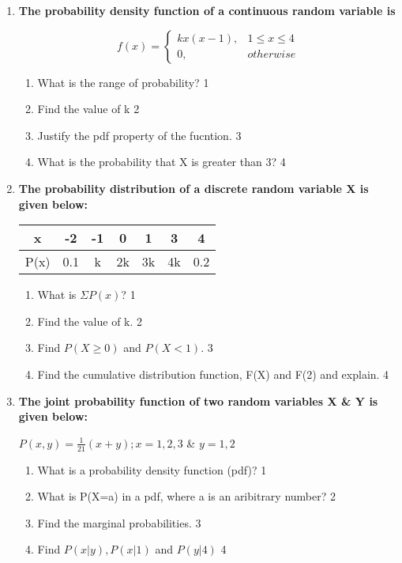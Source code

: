 \documentclass[a4paper,oneside, margin=1.4in]{book}
\begin{document}
\begin{enumerate}
    \item
  \textbf{The probability density function of a continuous random variable is}

$$
  f(x) =
\begin{cases}
kx(x-1),  & 1 \le x \le 4 \\
0, & otherwise
\end{cases}
$$

  \begin{enumerate}
    \item
	What is the range of probability? \hfill 1
    \item
    	Find the value of k \hfill 2
    \item
    	Justify the pdf property of the fucntion. \hfill 3
     \item
     	What is the probability that X is greater than 3?  \hfill 4
  \end{enumerate}


 \item
	  \textbf{The probability distribution of a discrete random variable X is given below:} 

	  \begin{table}[h]
	  \begin{center}
\begin{tabular}{c|cccccc}
x    & -2   & -1 & 0   & 1 & 3 & 4   \\ \hline
P(x) & 0.1 & k & 2k & 3k & 4k & 0.2
\end{tabular} 
\end{center}	
\end{table}
  
  \begin{enumerate}
    \item
	What is $\Sigma P(x)$? \hfill 1
    \item
	Find the value of k. \hfill 2
    \item  
	Find $P(X \geq 0)$ and $P(X < 1)$. \hfill 3
    \item
	Find the cumulative distribution function, F(X) and F(2) and explain. \hfill 4
  \end{enumerate}

 \item
	  \textbf{The joint probability function of two random variables X \& Y is given below:}

\begin{center}
$P(x,y) = \frac{1}{21}(x+y); x=1,2,3$ \& $y = 1,2$ 
\end{center}
  
  \begin{enumerate}
    \item
	What is a probability density function (pdf)? \hfill 1
    \item
	What is P(X=a) in a pdf, where a is an aribitrary number? \hfill 2
    \item  
	Find the marginal probabilities. \hfill 3
    \item
	Find $P(x \vert y), P(x \vert 1)$ and $P(y|4)$ \hfill 4
  \end{enumerate}
  

\end{enumerate}
\end{document}
